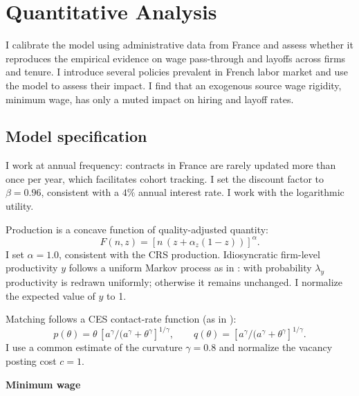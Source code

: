 \section{Quantitative Analysis}
I calibrate the model using administrative data from France and assess whether it reproduces the empirical evidence on wage pass-through and layoffs across firms and tenure. I introduce several policies prevalent in French labor market and use the model to assess their impact. I find that an exogenous source wage rigidity, minimum wage, has only a muted impact on hiring and layoff rates.


\subsection{Model specification}
I work at annual frequency: contracts in France are rarely updated more than once per year, which facilitates cohort tracking. I set the discount factor to $\beta=0.96$, consistent with a $4\%$ annual interest rate. I work with the logarithmic utility.

Production is a concave function of quality-adjusted quantity:
\[
F(n,z)=[n\,(z+\alpha_z(1-z))]^{\alpha}.
\]
I set $\alpha=1.0$, consistent with the CRS production. %
Idiosyncratic firm-level productivity $y$ follows a uniform Markov process as in \textcite{balke2022}: with probability $\lambda_y$ productivity is redrawn uniformly; otherwise it remains unchanged. I normalize the expected value of $y$ to 1.

Matching follows a CES contact-rate function (as in \textcite{menzio2011}):
\[
p(\theta)=\theta\,[a^\gamma/(a^\gamma+\theta^{\gamma}]^{1/\gamma}, \qquad
q(\theta)=[a^\gamma/(a^\gamma+\theta^{\gamma}]^{1/\gamma}.
\]
I use a common estimate of the curvature $\gamma=0.8$ and normalize the vacancy posting cost $c=1$.

\textbf{Minimum wage}

